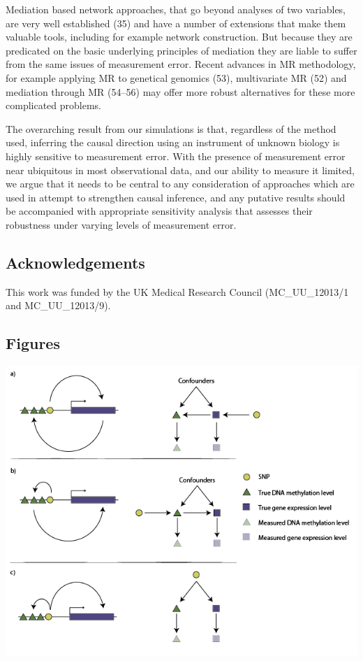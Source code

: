 \documentclass[]{article}
\begin{document}
Mediation based network approaches, that go beyond analyses of two
variables, are very well established (35) and have a number of
extensions that make them valuable tools, including for example network
construction. But because they are predicated on the basic underlying
principles of mediation they are liable to suffer from the same issues
of measurement error. Recent advances in MR methodology, for example
applying MR to genetical genomics (53), multivariate MR (52) and
mediation through MR (54--56) may offer more robust alternatives for
these more complicated problems.

The overarching result from our simulations is that, regardless of the
method used, inferring the causal direction using an instrument of
unknown biology is highly sensitive to measurement error. With the
presence of measurement error near ubiquitous in most observational
data, and our ability to measure it limited, we argue that it needs to
be central to any consideration of approaches which are used in attempt
to strengthen causal inference, and any putative results should be
accompanied with appropriate sensitivity analysis that assesses their
robustness under varying levels of measurement error.

\subsection{Acknowledgements}\label{acknowledgements}

This work was funded by the UK Medical Research Council (MC\_UU\_12013/1
and MC\_UU\_12013/9).

\newpage

\subsection{Figures}\label{figures}

\includegraphics{../images/dag-01.png}
\end{document}
